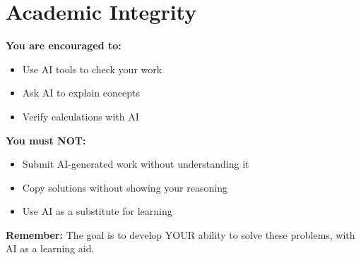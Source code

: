 \documentclass[11pt]{article}
\begin{document}
\section*{Academic Integrity}

\begin{tcolorbox}[colback=aiblue!10,colframe=aiblue,title=AI Usage Guidelines]

\textbf{You are encouraged to:}
\begin{itemize}
\item[+] Use AI tools to check your work
\item[+] Ask AI to explain concepts
\item[+] Verify calculations with AI
\end{itemize}

\textbf{You must NOT:}
\begin{itemize}
\item[-] Submit AI-generated work without understanding it
\item[-] Copy solutions without showing your reasoning
\item[-] Use AI as a substitute for learning
\end{itemize}

\textbf{Remember:} The goal is to develop YOUR ability to solve these problems, with AI as a learning aid.
\end{tcolorbox}
\end{document}
